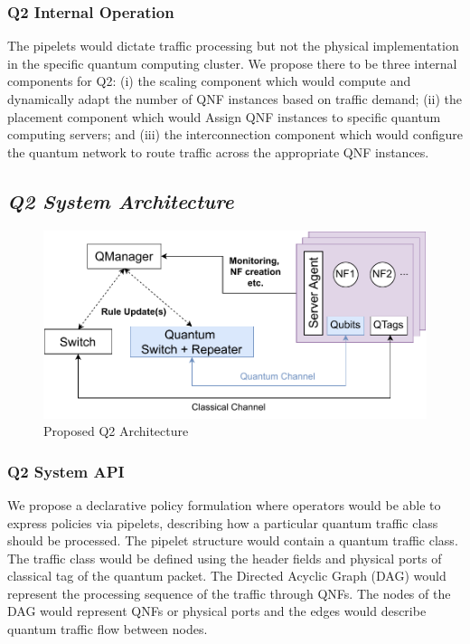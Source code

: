 \documentclass[sigplan,screen]{acmart}
\begin{document}
\subsubsection{Q2 Internal Operation} The pipelets would dictate traffic processing but not the physical implementation in the specific quantum computing cluster. We propose there to be three internal components for Q2: (i) the scaling component which would compute and dynamically adapt the number of QNF instances based on traffic demand; (ii) the placement component which would Assign QNF instances to specific quantum computing servers; and (iii) the interconnection component which would configure the quantum network to route traffic across the appropriate QNF instances. 

\subsection{\textit{Q2 System Architecture}}

\begin{figure}[H]
     \centering
     \includegraphics[width=0.9\linewidth]{images/E2toQuantum.pdf}
     \caption{Proposed Q2 Architecture}
     \label{fig:future}
\end{figure}

\subsubsection{Q2 System API}  
We propose a declarative policy formulation where operators would be able to express policies via pipelets, describing how a particular quantum traffic class should be processed. The pipelet structure would contain a quantum traffic class. The traffic class would be defined using the header fields and physical ports of classical tag of the quantum packet. The Directed Acyclic Graph (DAG) would represent the processing sequence of the traffic through QNFs. The nodes of the DAG would represent QNFs or physical ports and the edges would describe quantum traffic flow between nodes.
\end{document}
